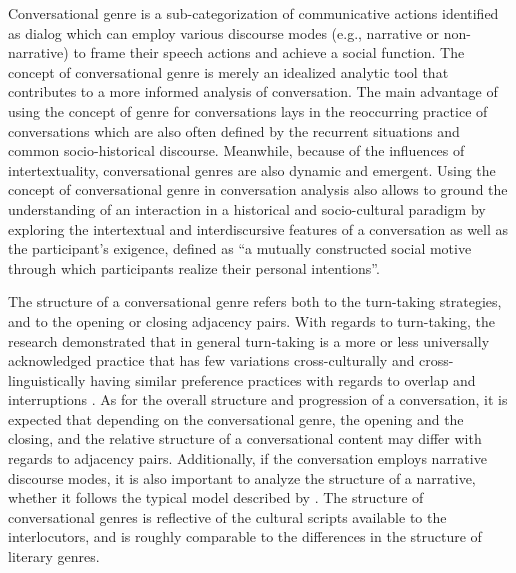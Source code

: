 \documentclass[12pt]{article}
\begin{document}
Conversational genre is a sub-categorization of communicative actions identified as dialog which can employ various discourse modes (e.g., narrative or non-narrative) to frame their speech actions and achieve a social function. The concept of conversational genre is merely an idealized analytic tool that contributes to a more informed analysis of conversation. The main advantage of using the concept of genre for conversations lays in the reoccurring practice of conversations which are also often defined by the recurrent situations and common socio-historical discourse. Meanwhile, because of the influences of intertextuality, conversational genres are also dynamic and emergent. Using the concept of conversational genre in conversation analysis also allows to ground the understanding of an interaction in a historical and socio-cultural paradigm by exploring the intertextual and interdiscursive features of a conversation as well as the participant's exigence, defined as ``a mutually constructed social motive through which participants realize their personal intentions''\parencite[p. 333]{mayes2005}.

The structure of a conversational genre refers both to the turn-taking strategies, and to the opening or closing adjacency pairs. With regards to turn-taking, the research demonstrated that in general turn-taking is a more or less universally acknowledged practice that has few variations cross-culturally and cross-linguistically having similar preference practices with regards to overlap and interruptions \parencite{stivers2009}. As for the overall structure and progression of a conversation, it is expected that depending on the conversational genre, the opening and the closing, and the relative structure of a conversational content may differ with regards to adjacency pairs. Additionally, if the conversation employs narrative discourse modes, it is also important to analyze the structure of a narrative, whether it follows the typical model described by \textcite{labov1967}. The structure of conversational genres is reflective of the cultural scripts available to the interlocutors, and is roughly comparable to the differences in the structure of literary genres.
\end{document}

